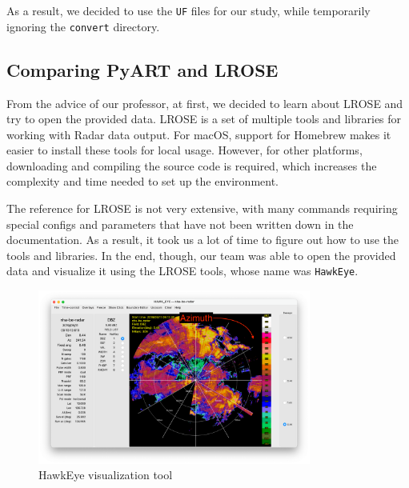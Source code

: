 As a result, we decided to use the \texttt{UF} files for our study, while temporarily ignoring the \texttt{convert} directory.


\subsection{Comparing PyART and LROSE}
From the advice of our professor, at first, we decided to learn about LROSE and try to open the provided data.
LROSE is a set of multiple tools and libraries for working with Radar data output.
For macOS, support for Homebrew makes it easier to install these tools for local usage.
However, for other platforms, downloading and compiling the source code is required,
which increases the complexity and time needed to set up the environment.

The reference for LROSE is not very extensive, with many commands requiring special configs and parameters that have not been written down
in the documentation. As a result, it took us a lot of time to figure out how to use the tools and libraries. In the end, though,
our team was able to open the provided data and visualize it using the LROSE tools, whose name was \texttt{HawkEye}.

\begin{figure}[H]
    \centering
    \includegraphics[width=0.8\textwidth]{Images/3.5-hawk-eye.png}
    \caption{HawkEye visualization tool}
    \label{fig:hawkeye}
\end{figure}